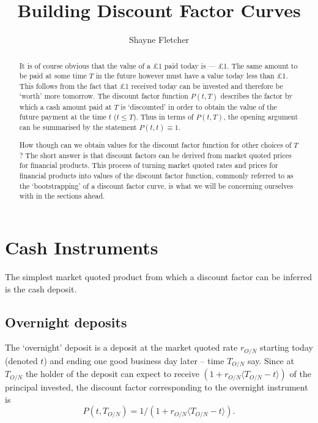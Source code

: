\documentclass[a4paper]{article}
\begin{document}
\title{Building Discount Factor Curves}
\author{Shayne Fletcher}
\maketitle
\clearpage
\begin{abstract}
It is of course obvious that the value of a \pounds1 paid today is --- \pounds1. The same amount to be paid at some time $T$ in the future however must have a value today less than \pounds1. This follows from the fact that \pounds1 received today can be invested and therefore be `worth' more tomorrow. The discount factor function $P(t, T)$ describes the factor by which a cash amount paid at $T$ is `discounted' in order to obtain the value of the future payment at the time $t$ ($t \leq T $). Thus in terms of $P(t, T)$, the opening argument can be summarised by the statement $P(t, t) \equiv 1$.

How though can we obtain values for the discount factor function for other choices of $T$? The short answer is that discount factors can be derived from market quoted prices for financial products. This process of turning market quoted rates and prices for financial products into values of the discount factor function, commonly referred to as the `bootstrapping' of a discount factor curve, is what we will be concerning ourselves with in the sections ahead.
\end{abstract}


\section{Cash Instruments}

The simplest market quoted product from which a discount factor can be inferred is the cash deposit.

\subsection{Overnight deposits}

The `overnight' deposit is a deposit at the market quoted rate $r_{O/N}$ starting today (denoted $t$) and ending one good business day later -- time $T_{O/N}$ say. Since at $T_{O/N}$ the holder of the deposit can expect to receive $\left(1 + r_{O/N}\langle T_{O/N}-t \rangle \right)$ of the principal invested, the discount factor corresponding to the overnight instrument is
\begin{equation}
  P(t, T_{O/N}) = 1 / \left(1 + r_{O/N} \langle T_{O/N}-t \rangle\right).
\end{equation}
\end{document}
